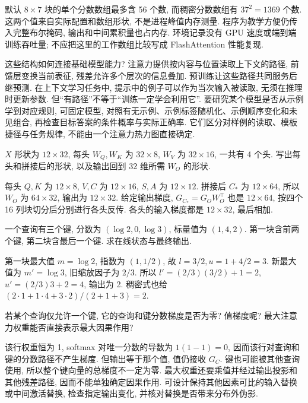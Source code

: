 默认 $8\times7$ 块的单个分数数组最多含 56 个数, 而稠密分数数组有 $37^2=1369$ 个数. 这两个值来自实际配置和数组形状, 不是进程峰值内存测量. 程序为教学方便仍传入完整布尔掩码, 输出和中间累积量也占内存. 环境记录没有 GPU 速度或端到端训练吞吐量; 不应把这里的工作数组比较写成 FlashAttention 性能复现.

这些结构如何连接基础模型能力? 注意力提供按内容与位置读取上下文的路径, 前馈层变换当前表征, 残差允许多个层次的信息叠加. 预训练让这些路径共同服务后继预测. 在上下文学习任务中, 提示中的例子可以作为当次输入被读取, 无须在推理时更新参数. 但“有路径”不等于“训练一定学会利用它”. 要研究某个模型是否从示例学到对应规则, 可固定模型, 对照有无示例、示例标签随机化、示例顺序变化和未见组合, 再检查目标答案的条件概率与实际正确率. 它们区分对样例的读取、模板捷径与任务规律, 不能由一个注意力热力图直接确定.

\begin{exercise}
$X$ 形状为 $12\times32$, 每头 $W_Q,W_K$ 为 $32\times8$, $W_V$ 为 $32\times16$, 一共有 4 个头. 写出每头和拼接后的形状, 以及输出回到 32 维所需 $W_O$ 的形状.
\end{exercise}
\begin{solution}
每头 $Q,K$ 为 $12\times8$, $V,C$ 为 $12\times16$, $S,A$ 为 $12\times12$. 拼接后 $C_*$ 为 $12\times64$, 所以 $W_O$ 为 $64\times32$, 输出为 $12\times32$. 给定输出梯度, $G_{C_*}=G_OW_O^\top$ 也是 $12\times64$, 按四个 16 列块切分后分别进行各头反传. 各头的输入梯度都是 $12\times32$, 最后相加.
\end{solution}
\begin{exercise}
一个查询有三个键, 分数为 $(\log2,0,\log3)$, 标量值为 $(1,4,2)$. 第一块含前两个键, 第二块含最后一个键. 求在线状态与最终输出.
\end{exercise}
\begin{solution}
第一块最大值 $m=\log2$, 指数为 $(1,1/2)$, 故 $l=3/2,u=1+4/2=3$. 新最大值为 $m'=\log3$, 旧缩放因子为 $2/3$. 所以 $l'=(2/3)(3/2)+1=2$, $u'=(2/3)3+2=4$, 输出为 2. 稠密式也给 $(2\cdot1+1\cdot4+3\cdot2)/(2+1+3)=2$.
\end{solution}
\begin{exercise}
若某个查询仅允许一个键, 它的查询和键分数梯度是否为零? 值梯度呢? 最大注意力权重能否直接表示最大因果作用?
\end{exercise}
\begin{solution}
该行权重恒为 1, softmax 对唯一分数的导数为 $1(1-1)=0$, 因而该行对查询和键的分数路径不产生梯度. 但输出等于那个值, 值仍接收 $G_C$. 键也可能被其他查询使用, 所以整个键向量的总梯度不一定为零. 最大权重还要乘值并经过输出投影和其他残差路径, 因而不能单独确定因果作用. 可设计保持其他因素可比的输入替换或中间激活替换, 检查指定输出变化, 并核对替换是否带来分布外伪影.
\end{solution}
